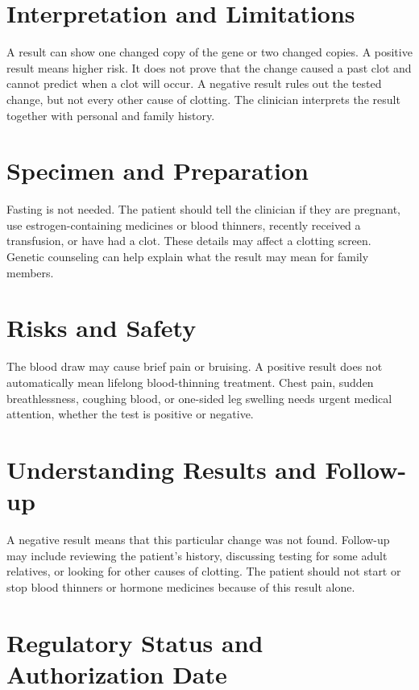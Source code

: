 \section*{Interpretation and Limitations}
A result can show one changed copy of the gene or two changed copies. A positive result means higher risk. It does not prove that the change caused a past clot and cannot predict when a clot will occur. A negative result rules out the tested change, but not every other cause of clotting. The clinician interprets the result together with personal and family history.
\section*{Specimen and Preparation}
Fasting is not needed. The patient should tell the clinician if they are pregnant, use estrogen-containing medicines or blood thinners, recently received a transfusion, or have had a clot. These details may affect a clotting screen. Genetic counseling can help explain what the result may mean for family members.

\section*{Risks and Safety}
The blood draw may cause brief pain or bruising. A positive result does not automatically mean lifelong blood-thinning treatment. Chest pain, sudden breathlessness, coughing blood, or one-sided leg swelling needs urgent medical attention, whether the test is positive or negative.

\section*{Understanding Results and Follow-up}
A negative result means that this particular change was not found. Follow-up may include reviewing the patient's history, discussing testing for some adult relatives, or looking for other causes of clotting. The patient should not start or stop blood thinners or hormone medicines because of this result alone.

\section*{Regulatory Status and Authorization Date}

\clearpage
